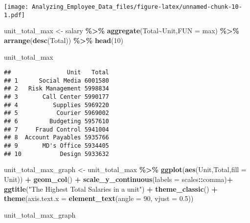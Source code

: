 \documentclass[
]{article}
\newenvironment{Shaded}{\begin{snugshade}}{\end{snugshade}}
\newcommand{\AttributeTok}[1]{\textcolor[rgb]{0.13,0.29,0.53}{#1}}
\newcommand{\DecValTok}[1]{\textcolor[rgb]{0.00,0.00,0.81}{#1}}
\newcommand{\FloatTok}[1]{\textcolor[rgb]{0.00,0.00,0.81}{#1}}
\newcommand{\FunctionTok}[1]{\textcolor[rgb]{0.13,0.29,0.53}{\textbf{#1}}}
\newcommand{\NormalTok}[1]{#1}
\newcommand{\OtherTok}[1]{\textcolor[rgb]{0.56,0.35,0.01}{#1}}
\newcommand{\SpecialCharTok}[1]{\textcolor[rgb]{0.81,0.36,0.00}{\textbf{#1}}}
\newcommand{\StringTok}[1]{\textcolor[rgb]{0.31,0.60,0.02}{#1}}
\begin{document}
\texttt{[image: Analyzing\_Employee\_Data\_files/figure-latex/unnamed-chunk-10-1.pdf]}

\begin{Shaded}
\begin{Highlighting}[]
\NormalTok{unit\_total\_max }\OtherTok{\textless{}{-}}\NormalTok{ salary }\SpecialCharTok{\%\textgreater{}\%} 
  \FunctionTok{aggregate}\NormalTok{(Total}\SpecialCharTok{\textasciitilde{}}\NormalTok{Unit,}\AttributeTok{FUN =}\NormalTok{ max) }\SpecialCharTok{\%\textgreater{}\%} 
  \FunctionTok{arrange}\NormalTok{(}\FunctionTok{desc}\NormalTok{(Total)) }\SpecialCharTok{\%\textgreater{}\%} 
  \FunctionTok{head}\NormalTok{(}\DecValTok{10}\NormalTok{)}

\NormalTok{unit\_total\_max}
\end{Highlighting}
\end{Shaded}

\begin{verbatim}
##                Unit   Total
## 1      Social Media 6001580
## 2   Risk Management 5998834
## 3       Call Center 5990177
## 4          Supplies 5969220
## 5           Courier 5969002
## 6         Budgeting 5957610
## 7     Fraud Control 5941004
## 8  Account Payables 5935766
## 9       MD's Office 5934405
## 10           Design 5933632
\end{verbatim}

\begin{Shaded}
\begin{Highlighting}[]
\NormalTok{unit\_total\_max\_graph }\OtherTok{\textless{}{-}}\NormalTok{ unit\_total\_max }\SpecialCharTok{\%\textgreater{}\%} 
  \FunctionTok{ggplot}\NormalTok{(}\FunctionTok{aes}\NormalTok{(Unit,Total,}\AttributeTok{fill =}\NormalTok{ Unit)) }\SpecialCharTok{+}
  \FunctionTok{geom\_col}\NormalTok{() }\SpecialCharTok{+}
  \FunctionTok{scale\_y\_continuous}\NormalTok{(}\AttributeTok{labels =}\NormalTok{ scales}\SpecialCharTok{::}\NormalTok{comma)}\SpecialCharTok{+} 
  \FunctionTok{ggtitle}\NormalTok{(}\StringTok{"The Highest Total Salaries in a unit"}\NormalTok{) }\SpecialCharTok{+}  
  \FunctionTok{theme\_classic}\NormalTok{() }\SpecialCharTok{+} \FunctionTok{theme}\NormalTok{(}\AttributeTok{axis.text.x =} \FunctionTok{element\_text}\NormalTok{(}\AttributeTok{angle =} \DecValTok{90}\NormalTok{, }\AttributeTok{vjust =} \FloatTok{0.5}\NormalTok{))}


\NormalTok{unit\_total\_max\_graph}
\end{Highlighting}
\end{Shaded}
\end{document}
